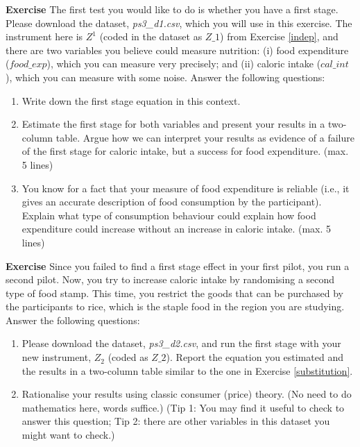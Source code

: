 \documentclass[10pt]{article}
\newcounter{exercise}
\newenvironment{exercise}%
{%
	\refstepcounter{exercise}%
	\textbf{Exercise \theexercise}%
	}%
{
 \par\vspace{\baselineskip}%
\noindent\ignorespacesafterend
}
\begin{document}

\begin{exercise}\label{substitution}
	The first test you would like to do is whether you have a first stage. Please download the dataset, \textit{ps3\_d1.csv}, which you will use in this exercise. The instrument here is $ Z^1 $ (coded in the dataset as $ Z\_1 $) from Exercise \ref{indep}, and there are two variables you believe could measure nutrition: (i) food expenditure ($ food\_exp $), which you can measure very precisely; and (ii) caloric intake ($ cal\_int $), which you can measure with some noise. Answer the following questions:
	\begin{enumerate}
		\item Write down the first stage equation in this context.
		\item Estimate the first stage for both variables and present your results in a two-column table. Argue how we can interpret your results as evidence of a failure of the first stage for caloric intake, but a success for food expenditure. (max. 5 lines)
		\item You know for a fact that your measure of food expenditure is reliable (i.e., it gives an accurate description of food consumption by the participant). Explain what type of consumption behaviour could explain how food expenditure could increase without an increase in caloric intake. (max. 5 lines)
	\end{enumerate}
\end{exercise}


\begin{exercise}\label{giffen}
	Since you failed to find a first stage effect in your first pilot, you run a second pilot. Now, you try to increase caloric intake by randomising a second type of food stamp. This time, you restrict the goods that can be purchased by the participants to rice, which is the staple food in the region you are studying. Answer the following questions:
	\begin{enumerate}
		\item Please download the dataset, \textit{ps3\_d2.csv}, and run the first stage with your new instrument, $ Z_{2} $ (coded as $ Z\_2 $). Report the equation you estimated and the results in a two-column table similar to the one in Exercise \ref{substitution}.
		\item Rationalise your results using classic consumer (price) theory. (No need to do mathematics here, words suffice.) (Tip 1: You may find it useful to check \citet{jensen2008} to answer this question; Tip 2: there are other variables in this dataset you might want to check.)
	\end{enumerate}
\end{exercise}
\end{document}
